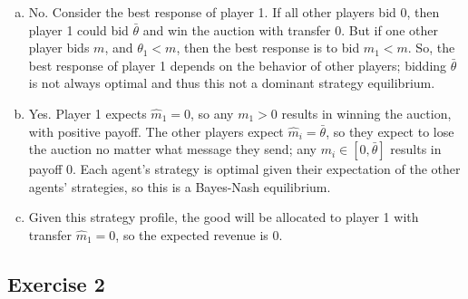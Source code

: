 \documentclass{article}
\begin{document}
\begin{enumerate}[(a)]
	\item

	No. Consider the best response of player 1. If all other players bid 0, then player 1 could bid $\bar{\theta}$ and win the auction with transfer 0. But if one other player bids $m$, and $\theta_1 < m$, then the best response is to bid $m_1 < m$. So, the best response of player 1 depends on the behavior of other players; bidding $\bar{\theta}$ is not always optimal and thus this not a dominant strategy equilibrium.

	\item

	Yes. Player 1 expects $\hat{m}_1 = 0$, so any $m_1 > 0$ results in winning the auction, with positive payoff. The other players expect $\hat{m}_i = \bar{\theta}$, so they expect to lose the auction no matter what message they send; any $m_i \in [0, \bar{\theta}]$ results in payoff 0. Each agent's strategy is optimal given their expectation of the other agents' strategies, so this is a Bayes-Nash equilibrium.

	\item

	Given this strategy profile, the good will be allocated to player 1 with transfer $\hat{m}_1 = 0$, so the expected revenue is 0.

\end{enumerate}

\subsection*{Exercise 2}
\end{document}
